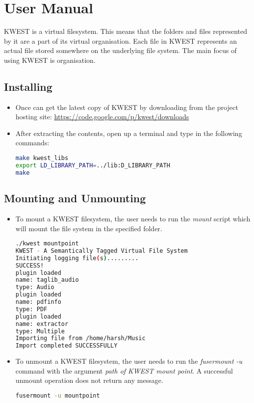 \chapter{User Manual}

KWEST is a virtual filesystem. This means that the folders and files represented by it are a part of its virtual organisation. Each file in KWEST represents an actual file stored somewhere on the underlying file system. The main focus of using KWEST is organisation.

\section{Installing}
\begin{itemize}
\item Once can get the latest copy of KWEST by downloading from the project hosting site: \url{https://code.google.com/p/kwest/downloads}
\item After extracting the contents, open up a terminal and type in the following commands:
\begin{lstlisting}[language=bash,frame=single]
make kwest_libs
export LD_LIBRARY_PATH=../lib:D_LIBRARY_PATH
make
\end{lstlisting}
\end{itemize}

\section{Mounting and Unmounting}

\begin{itemize}
\item To mount a KWEST filesystem, the user needs to run the \textit{mount} script which will mount the file system in the specified folder. 
\begin{lstlisting}[language=bash,frame=single]
./kwest mountpoint
KWEST - A Semantically Tagged Virtual File System
Initiating logging file(s).........
SUCCESS!
plugin loaded
name: taglib_audio
type: Audio
plugin loaded
name: pdfinfo
type: PDF
plugin loaded
name: extractor
type: Multiple
Importing file from /home/harsh/Music
Import completed SUCCESSFULLY
\end{lstlisting}
\item To unmount a KWEST filesystem, the user needs to run the \textit{fusermount -u} command with the argument \textit{path of KWEST mount point}. A successful unmount operation does not return any message.
\begin{lstlisting}[language=bash,frame=single]
fusermount -u mountpoint
\end{lstlisting}
\end{itemize}

